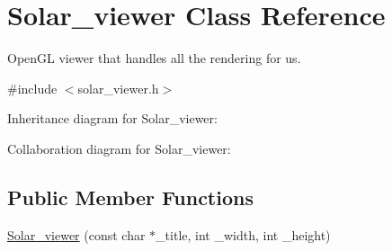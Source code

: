 \hypertarget{classSolar__viewer}{}\section{Solar\+\_\+viewer Class Reference}
\label{classSolar__viewer}


Open\+GL viewer that handles all the rendering for us.  




{\ttfamily \#include $<$solar\+\_\+viewer.\+h$>$}



Inheritance diagram for Solar\+\_\+viewer\+:


Collaboration diagram for Solar\+\_\+viewer\+:
\subsection*{Public Member Functions}
\begin{DoxyCompactItemize}
\item 
\hyperlink{classSolar__viewer_a0bde18b5e12179314b342ceb52aa465f}{Solar\+\_\+viewer} (const char $\ast$\+\_\+title, int \+\_\+width, int \+\_\+height)
\end{DoxyCompactItemize}
